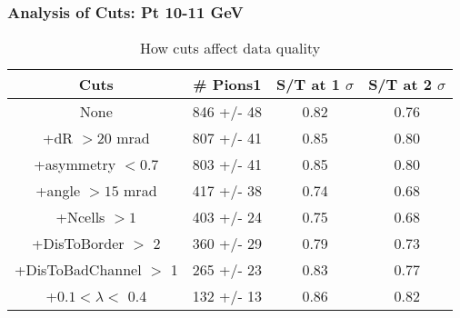 \frame
{
\frametitle{Analysis of Cuts: Pt 10-11 GeV}
\begin{table}
\caption{How cuts affect data quality}
\centering
\begin{tabular}{c c c c}
\hline\hline
Cuts & \# Pions1 & S/T at 1 $\sigma$ & S/T at 2 $\sigma$ \\ [0.5ex]
\hline
None &  846 +/-   48 & 0.82 & 0.76 \\ %
+dR $> 20$ mrad &  807 +/-   41 & 0.85 & 0.80 \\ %
+asymmetry $< 0.7$ &  803 +/-   41 & 0.85 & 0.80 \\ %
+angle $> 15$ mrad &  417 +/-   38 & 0.74 & 0.68 \\ %
+Ncells $> 1$&  403 +/-   24 & 0.75 & 0.68 \\ %
+DisToBorder $>$ 2 &  360 +/-   29 & 0.79 & 0.73 \\ %
+DisToBadChannel $>$ 1&  265 +/-   23 & 0.83 & 0.77 \\ %
+$0.1 < \lambda <$ 0.4 &  132 +/-   13 & 0.86 & 0.82 \\ %
[1ex]
\hline
\end{tabular}
\label{table:nonlin}
\end{table}
}
